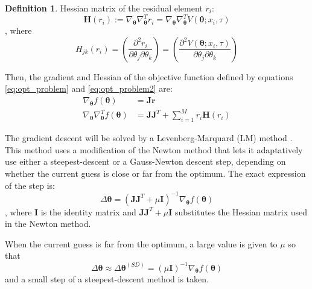 \documentclass[12,twoside]{mammeTFM}
\theoremstyle{definition}
\newtheorem{definition}[thm]{Definition}
\theoremstyle{remark}
\begin{document}
\begin{definition} Hessian matrix of the residual element $r_i$:
\begin{equation}
\boldsymbol{H}(r_i) := \nabla_{\boldsymbol{\theta}} \nabla_{\boldsymbol{\theta}}^{T} r_i = \nabla_{\boldsymbol{\theta}} \nabla_{\boldsymbol{\theta}}^{T} V(\boldsymbol{\theta}; x_i, \tau)
\end{equation}
, where
\begin{equation}
H_{jk}(r_i) = \left(\dfrac{\partial^2 r_i}{\partial \theta_j \partial \theta_k} \right) = \left(\dfrac{\partial^2 V(\boldsymbol{\theta}; x_i, \tau)}{\partial \theta_j\partial \theta_k} \right)
\end{equation}
\end{definition}

Then, the gradient and Hessian of the objective function defined by equations \ref{eq:opt_problem} and \ref{eq:opt_problem2} are:
\begin{align}
\nabla_{\boldsymbol{\theta}}f(\boldsymbol{\theta}) &= \boldsymbol{J}\boldsymbol{r} \\
\nabla_{\boldsymbol{\theta}}\nabla_{\boldsymbol{\theta}}^{T} f(\boldsymbol{\theta}) &= \boldsymbol{J}\boldsymbol{J}^{T} + \sum_{i = 1}^{M} r_i \boldsymbol{H}(r_i)
\end{align}

The gradient descent will be solved by a Levenberg-Marquard (LM) method \cite{mor78}. This method uses a modification of the Newton method that lets it adaptatively use either a steepest-descent or a Gauss-Newton descent step, depending on whether the current guess is close or far from the optimum. The exact expression of the step is:
\begin{equation}
\Delta \boldsymbol{\theta} = (\boldsymbol{J}\boldsymbol{J}^{T} + \mu \boldsymbol{I})^{-1} \nabla_{\boldsymbol{\theta}} f(\boldsymbol{\theta})
\end{equation}
, where $\boldsymbol{I}$ is the identity matrix and $\boldsymbol{J}\boldsymbol{J}^{T} + \mu \boldsymbol{I}$ substitutes the Hessian matrix used in the Newton method.

When the current guess is far from the optimum, a large value is given to $\mu$ so that
\begin{equation}
\Delta \boldsymbol{\theta} \approx \Delta \boldsymbol{\theta}^{(SD)} = (\mu \boldsymbol{I})^{-1} \nabla_{\boldsymbol{\theta}} f(\boldsymbol{\theta})
\end{equation}
and a small step of a steepest-descent method is taken.
\end{document}
